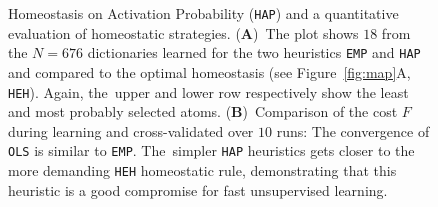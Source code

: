 \documentclass[vision,article,accept,oneauthor,pdftex]{Definitions/mdpi}
\newcommand{\seeFig}[1]{Figure~\ref{fig:#1}}%
\begin{document}
\begin{figure}[H]
\caption{
{Homeostasis on Activation Probability (\texttt{HAP}) and a quantitative evaluation of homeostatic strategies}. %
 {(\textbf{A})}~The plot shows $18$ from the $N=676$ dictionaries learned for the two heuristics \texttt{EMP} and \texttt{HAP} and compared to the optimal homeostasis (see \seeFig{map}A, \texttt{HEH}).
 Again, the~upper and lower row respectively show the least and most probably selected atoms. {(\textbf{B})}~Comparison of the cost $F$ during learning and cross-validated over $10$ runs: The convergence of \texttt{OLS} is similar to \texttt{EMP}. The~simpler \texttt{HAP} heuristics gets closer to the more demanding \texttt{HEH} homeostatic rule, demonstrating that this heuristic is a good compromise for fast unsupervised learning.
\label{fig:HAP}}%
\end{figure}%
\end{document}
